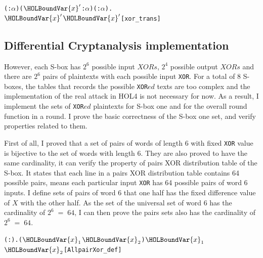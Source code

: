 \documentclass{article}
\begin{document}
\begin{alltt}
  \HOLTokenTurnstile{} \HOLSymConst{\HOLTokenForall{}}( :\ensuremath{\alpha} ) (\ensuremath{\HOLBoundVar{x}\sp{\prime{}}} :\ensuremath{\alpha} ) ( :\ensuremath{\alpha} ).
      \HOLSymConst{\HOLTokenEor{}}  \HOLSymConst{=} \ensuremath{\HOLBoundVar{x}\sp{\prime{}}} \HOLSymConst{\HOLTokenImp{}}  \HOLSymConst{\HOLTokenEor{}} \ensuremath{\HOLBoundVar{x}\sp{\prime{}}} \HOLSymConst{=} \hfill{[xor_trans]}
\end{alltt}

\subsection{Differential Cryptanalysis implementation}
However, each S-box has $2^6$ possible input $XORs$, $2^4$ possible output $XORs$ and there are $2^6$ pairs of plaintexts
with each possible input \verb|XOR|. For a total of 8 S-boxes, the tables that records the possible \verb|XOR|$ed$ texts are too
complex and the implementation of the real attack in HOL4 is not necessary for now. As a result, I implement the sets of \verb|XOR|$ed$
plaintexts for S-box one and for the overall round function in a round. I prove the basic correctness of the S-box one
set, and verify properties related to them.

First of all, I proved that a set of pairs of words of length 6 with fixed \verb|XOR| value is bijective to the set of
words with length 6. They are also proved to have the same cardinality, it can verify the property of pairs XOR distribution
table of
the S-box. It states that each line in a pairs XOR distribution table contains 64 possible pairs, means each particular
input \verb|XOR| has 64 possible pairs of word 6 inputs. I define
sets of pairs of word 6 that one half has the fixed difference value of $X$ with the other half. As the set of
the universal set of word 6 has the cardinality of $2^6\;=\;64$, I can then prove the pairs sets also has the cardinality
of $2^6\;=\;64$.

\begin{alltt}
  \HOLTokenTurnstile{} \HOLSymConst{\HOLTokenForall{}}( :).   \HOLSymConst{=} \HOLTokenLeftbrace{}(\ensuremath{\HOLBoundVar{x}\sb{\mathrm{1}}}\HOLSymConst{,}\ensuremath{\HOLBoundVar{x}\sb{\mathrm{2}}}) \HOLTokenBar{} \ensuremath{\HOLBoundVar{x}\sb{\mathrm{1}}} \HOLSymConst{\HOLTokenEor{}} \ensuremath{\HOLBoundVar{x}\sb{\mathrm{2}}} \HOLSymConst{=} \HOLTokenRightbrace{}\hfill{[AllpairXor_def]}
\end{alltt}
\end{document}
